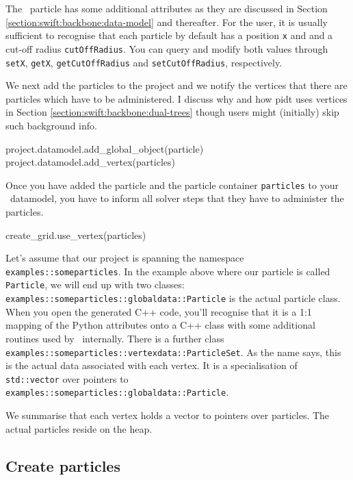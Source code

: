 \noindent
The \Peano\ particle has some additional attributes as they are discussed in 
Section \ref{section:swift:backbone:data-model} and thereafter. 
For the user, it is usually sufficient to recognise that each particle by 
default has a position \texttt{x} and and a cut-off radius
\texttt{cutOffRadius}.
You can query and modify both values through \texttt{setX}, \texttt{getX},
\texttt{getCutOffRadius} and \texttt{setCutOffRadius}, respectively.


We next add the particles to the project and we notify the vertices that there 
are particles which have to be administered. 
I discuss why and how pidt uses vertices in Section
\ref{section:swift:backbone:dual-trees} though users might (initially) skip such
background info. 

\begin{code}
project.datamodel.add_global_object(particle)
project.datamodel.add_vertex(particles)
\end{code}

\noindent
Once you have added the particle and the particle container \texttt{particles}
to your \Peano\ datamodel, you have to inform all solver steps that they have to
administer the particles.

\begin{code}
create_grid.use_vertex(particles)
\end{code}

\noindent
Let's assume that our project is spanning the namespace
\texttt{examples::someparticles}.
 In the example above where our particle is
called \texttt{Particle}, we will end up with two classes:
\linebreak
\texttt{examples::someparticles::globaldata::Particle} is the actual particle
class. 
When you open the generated C++ code, you'll recognise that it is a 1:1 mapping
of the Python attributes onto a C++ class with some additional routines used by
\Peano\ internally.
There is a further class
\texttt{examples::someparticles::vertexdata::ParticleSet}.
As the name says, this is the actual data associated with each vertex.
It is a specialisation of \texttt{std::vector} over pointers to
\texttt{examples::someparticles::globaldata::Particle}.

We summarise that each vertex holds a vector to pointers over particles.
The actual particles reside on the heap.



\subsection{Create particles}

